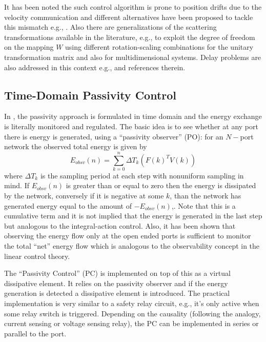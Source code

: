 It has been noted the such control algorithm is prone to position drifts due to the velocity communication and 
different alternatives have been proposed to tackle this mismatch e.g., \cite{yokokohji,chopratro06}. 
Also there are generalizations of the scattering 
transformations available in the literature, e.g., \cite{hirchebuss} to exploit the degree of freedom on the 
mapping $W$ using different rotation-scaling combinations for the unitary transformation matrix and also 
\cite{stramigioli} for multidimensional systems. Delay problems are also addressed in this context e.g., 
\cite{chopraberes,munirbook,nieslotine97,uedayoshikawa} and references therein. 



\subsection{Time-Domain Passivity Control}
In \cite{hannafordryu}, the passivity approach is formulated in time domain and the energy exchange is literally
monitored and regulated. The basic idea is to see whether at any port there is energy is generated, using a ``passivity
observer'' (PO): for an $N-$port network the observed total energy is given by
\[
E_{obsv}(n) = \sum_{k=0}^n \Delta T_k(F(k)^TV(k))
\]
where $\Delta T_k$ is the sampling period at each step with nonuniform sampling in mind. If 
$E_{obsv}(n) $ is greater than or equal to zero then the energy is dissipated by the network, conversely if
it is negative at some $k$, than the network has generated energy equal to the amount of $-E_{obsv}(n)$,. Note that
this is a cumulative term and it is not implied that the energy is generated in the last step but analogous to the 
integral-action control. Also, it has been shown that observing the energy flow only at the open ended ports is 
sufficient to monitor the total ``net'' energy flow which is analogous to the observability concept in the 
linear control theory. 

The ``Passivity Control'' (PC) is implemented on top of this as a virtual dissipative element. It relies on the 
passivity observer and if the energy generation is detected a dissipative element is introduced. The practical 
implementation is very similar to a safety relay circuit, e.g., it's only active when some relay switch is 
triggered. Depending on the causality (following the analogy, current sensing or voltage sensing relay), the 
PC can be implemented in series or parallel to the port. 

